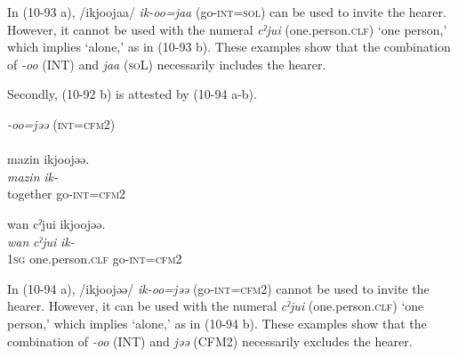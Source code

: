 In (10-93 a), /ikjoojaa/ \textit{ik-oo=jaa} (go-\textsc{int}=\textsc{sol}) can be used to invite the hearer. However, it cannot be used with the numeral \textit{cˀjui} (one.person.\textsc{clf}) ‘one person,’ which implies ‘alone,’ as in (10-93 b). These examples show that the combination of \textit{{}-}\textit{oo} (INT) and \textit{jaa} (\textsc{so}L) necessarily includes the hearer.

Secondly, (10-92 b) is attested by (10-94 a-b).

\ea\label{ex:10.94}   \textit{{}-oo=jəə} (\textsc{int}=\textsc{cfm}2)\\
  \ea{}\\
      \glll    *mazin  ikjoojəə.\\
       \textit{mazin}  \textit{ik-}\\
       together  go-\textsc{int}=\textsc{cfm}2\\
       \glt\relax      [El: 090830]

  \ex  %
      \glll    wan  cˀjui  ikjoojəə.\\
       \textit{wan}  \textit{cˀjui}  \textit{ik-}\\
       1\textsc{sg}  one.person.\textsc{clf}  go-\textsc{int}=\textsc{cfm}2\\
       \glt\relax    [El: 090830]
    \z
\z

In (10-94 a), /ikjoojəə/ \textit{ik-oo=jəə} (go-\textsc{int}=\textsc{cfm}2) cannot be used to invite the hearer. However, it can be used with the numeral \textit{cˀjui} (one.person.\textsc{clf}) ‘one person,’ which implies ‘alone,’ as in (10-94 b). These examples show that the combination of \textit{{}-oo} (INT) and \textit{jəə} (CFM2) necessarily excludes the hearer.
